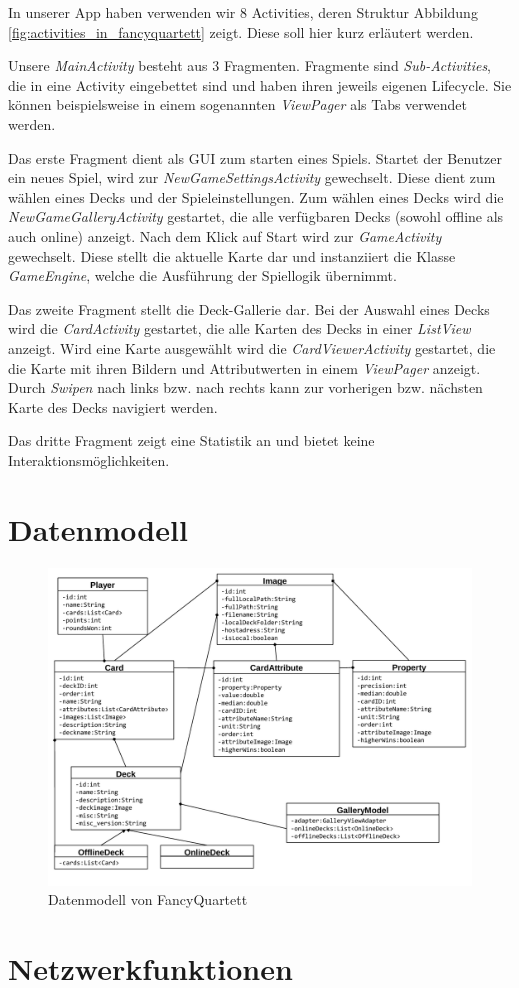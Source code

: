 In unserer App haben verwenden wir 8 Activities, deren Struktur Abbildung \ref{fig:activities_in_fancyquartett} zeigt. Diese soll hier kurz erläutert werden.

Unsere \emph{MainActivity} besteht aus 3 Fragmenten. Fragmente sind \emph{Sub-Activities}, die in eine Activity eingebettet sind und haben ihren jeweils eigenen Lifecycle. Sie können beispielsweise in einem sogenannten \emph{ViewPager} als Tabs verwendet werden.

Das erste Fragment dient als GUI zum starten eines Spiels. Startet der Benutzer ein neues Spiel, wird zur \emph{NewGameSettingsActivity} gewechselt. Diese dient zum wählen eines Decks und der Spieleinstellungen. Zum wählen eines Decks wird die \emph{NewGameGalleryActivity} gestartet, die alle verfügbaren Decks (sowohl offline als auch online) anzeigt. Nach dem Klick auf Start wird zur \emph{GameActivity} gewechselt. Diese stellt die aktuelle Karte dar und instanziiert die Klasse \emph{GameEngine}, welche die Ausführung der Spiellogik übernimmt.

Das zweite Fragment stellt die Deck-Gallerie dar. Bei der Auswahl eines Decks wird die \emph{CardActivity} gestartet, die alle Karten des Decks in einer \emph{ListView} anzeigt. Wird eine Karte ausgewählt wird die \emph{CardViewerActivity} gestartet, die die Karte mit ihren Bildern und Attributwerten in einem \emph{ViewPager} anzeigt. Durch \emph{Swipen} nach links bzw. nach rechts kann zur vorherigen bzw. nächsten Karte des Decks navigiert werden.

Das dritte Fragment zeigt eine Statistik an und bietet keine Interaktionsmöglichkeiten.

\section{Datenmodell}
\label{sec:datenmodell}

\begin{figure}[ht]
    \centering
    \includegraphics[width=\textwidth]{../img/Datenmodell.pdf}
    \caption{Datenmodell von FancyQuartett}
    \label{fig:datenmodell}
\end{figure}

\section{Netzwerkfunktionen}
\label{sec:netzwerkfunktionen}